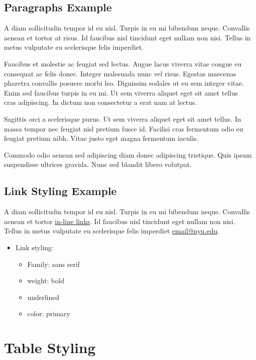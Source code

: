 \documentclass[notitlepage]{nyu22report}
\begin{document}
\section{Paragraphs Example}

A diam sollicitudin tempor id eu nisl. Turpis in eu mi bibendum neque. Convallis
aenean et tortor at risus. Id faucibus nisl tincidunt eget nullam non nisi.
Tellus in metus vulputate eu scelerisque felis imperdiet.

Faucibus et molestie ac feugiat sed lectus. Augue lacus viverra vitae congue eu
consequat ac felis donec. Integer malesuada nunc vel risus. Egestas maecenas
pharetra convallis posuere morbi leo. Dignissim sodales ut eu sem integer vitae.
Enim sed faucibus turpis in eu mi. Ut sem viverra aliquet eget sit amet tellus
cras adipiscing. In dictum non consectetur a erat nam at lectus.

Sagittis orci a scelerisque purus. Ut sem viverra aliquet eget sit amet tellus.
In massa tempor nec feugiat nisl pretium fusce id. Facilisi cras fermentum odio
eu feugiat pretium nibh. Vitae justo eget magna fermentum iaculis.

Commodo odio aenean sed adipiscing diam donec adipiscing tristique. Quis ipsum
suspendisse ultrices gravida. Nunc sed blandit libero volutpat.

\section{Link Styling Example}

A diam sollicitudin tempor id eu nisl. Turpis in eu mi bibendum neque. Convallis
aenean et tortor \href{https://www.nyu.edu/}{in-line links}. Id faucibus nisl
tincidunt eget nullam non nisi. Tellus in metus vulputate eu scelerisque felis
imperdiet \href{mailto:email@nyu.edu}{email@nyu.edu}. 

\begin{itemize}
    \item Link styling:
    \begin{itemize}
        \item Family: sans serif
        \item weight: bold
        \item underlined
        \item color: primary
    \end{itemize}
\end{itemize}

\chapter{Table Styling}
\end{document}
